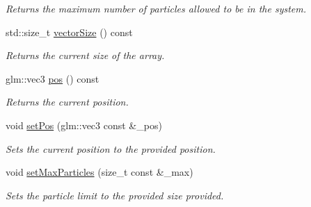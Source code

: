 \begin{DoxyCompactItemize}
\begin{DoxyCompactList}\small\item\em Returns the maximum number of particles allowed to be in the system. \end{DoxyCompactList}\item 
\hypertarget{classEmitter_a4320b2c9aff78bc6fbb318b320291f6f}{std\-::size\-\_\-t \hyperlink{classEmitter_a4320b2c9aff78bc6fbb318b320291f6f}{vector\-Size} () const }\label{classEmitter_a4320b2c9aff78bc6fbb318b320291f6f}

\begin{DoxyCompactList}\small\item\em Returns the current size of the array. \end{DoxyCompactList}\item 
\hypertarget{classEmitter_a8d3c4dba0d12c1952350cbc4cda69db7}{glm\-::vec3 \hyperlink{classEmitter_a8d3c4dba0d12c1952350cbc4cda69db7}{pos} () const }\label{classEmitter_a8d3c4dba0d12c1952350cbc4cda69db7}

\begin{DoxyCompactList}\small\item\em Returns the current position. \end{DoxyCompactList}\item 
void \hyperlink{classEmitter_a6229955278657909f2f88731d5015118}{set\-Pos} (glm\-::vec3 const \&\-\_\-pos)
\begin{DoxyCompactList}\small\item\em Sets the current position to the provided position. \end{DoxyCompactList}\item 
void \hyperlink{classEmitter_aa8ee7a71384a6759b675188221630f1a}{set\-Max\-Particles} (size\-\_\-t const \&\-\_\-max)
\begin{DoxyCompactList}\small\item\em Sets the particle limit to the provided size provided. \end{DoxyCompactList}\end{DoxyCompactItemize}
